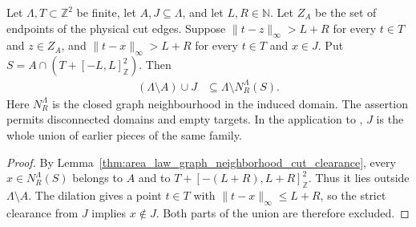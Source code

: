 \begin{lemma}
    \label{thm:area_law_graph_neighborhood_remote_exclusion}
    \leanok
    Let $\Lambda,T\subset\mathbb Z^2$ be finite, let $A,J\subseteq\Lambda$,
    and let $L,R\in\mathbb N$. Let $Z_A$ be the set of endpoints of
    the physical cut edges. Suppose $\|t-z\|_\infty>L+R$ for every
    $t\in T$ and $z\in Z_A$, and $\|t-x\|_\infty>L+R$ for every
    $t\in T$ and $x\in J$.
    Put $S=A\cap(T+[-L,L]^2_{\mathbb Z})$. Then
    \begin{align*}
        (\Lambda\setminus A)\cup J
         & \subseteq\Lambda\setminus N_R^\Lambda(S).
    \end{align*}
    Here $N_R^\Lambda$ is the closed graph neighbourhood in the induced
    domain. The assertion permits disconnected domains and empty targets.
    In the application to \cite[Theorem~1.1, lines~825--838 of
        Section~11]{OpenAI2026AreaLaw}, $J$ is the whole union of earlier
    pieces of the same family.
\end{lemma}
\begin{proof}\leanok
    By Lemma~\ref{thm:area_law_graph_neighborhood_cut_clearance},
    every $x\in N_R^\Lambda(S)$ belongs to $A$ and to
    $T+[-(L+R),L+R]^2_{\mathbb Z}$. Thus it lies outside
    $\Lambda\setminus A$. The dilation gives a point $t\in T$
    with $\|t-x\|_\infty\le L+R$, so the strict clearance from $J$
    implies $x\notin J$. Both parts of the union are therefore excluded.
\end{proof}
